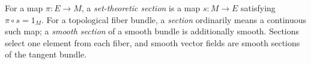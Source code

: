 
For a map $\pi:E\to M$, a \emph{set-theoretic section} is a map $s:M\to E$ satisfying $\pi\circ s=1_M$. For a topological fiber bundle, a \emph{section} ordinarily means a continuous such map; a \emph{smooth section} of a smooth bundle is additionally smooth. Sections select one element from each fiber, and smooth vector fields are smooth sections of the tangent bundle.
